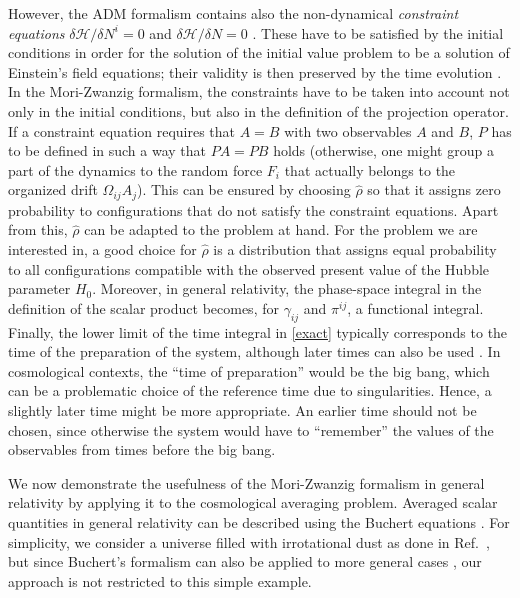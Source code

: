 \documentclass[aps,prl,twocolumn,10pt,superscriptaddress,nofootinbib,balancelastpage]{revtex4-1}
\newcommand{\ZT}[1]{\textquotedblleft#1\textquotedblright}%
\begin{document}
However, the {ADM} formalism contains also the non-dynamical \textit{constraint equations} $\delta \mathcal{H}/\delta N^i=0$ and $\delta \mathcal{H}/\delta N = 0$ \cite{Gourgoulhon2007}. These have to be satisfied by the initial conditions in order for the solution of the initial value problem to be a solution of Einstein's field equations; their validity is then preserved by the time evolution \cite{Gourgoulhon2007,Lehner2001}. In the Mori-Zwanzig formalism, the constraints have to be taken into account not only in the initial conditions, but also in the definition of the projection operator. If a constraint equation requires that $A=B$ with two observables $A$ and $B$, $P$ has to be defined in such a way that $PA=PB$ holds (otherwise, one might group a part of the dynamics to the random force $F_i$ that actually belongs to the organized drift $\Omega_{ij}A_j$). This can be ensured by choosing $\hat{\rho}$ so that it assigns zero probability to configurations that do not satisfy the constraint equations. Apart from this, $\hat{\rho}$ can be adapted to the problem at hand. For the problem we are interested in, a good choice for $\hat{\rho}$ is a distribution that assigns equal probability to all configurations compatible with the observed present value of the Hubble parameter $H_0$. Moreover, in general relativity, the phase-space integral in the definition of the  scalar  product becomes, for $\gamma_{ij}$ and $\pi^{ij}$, a functional integral. Finally, the lower limit of the time integral in \cref{exact} typically corresponds to the time of the preparation of the system, although later times can also be used \cite{Grabert1978}. In cosmological contexts, the \ZT{time of preparation} would be the big bang, which can be a problematic choice of the reference time due to singularities. Hence, a slightly later time might be more appropriate. An earlier time should not be chosen, since otherwise the system would have to \ZT{remember} the values of the observables from times before the big bang. 

We now demonstrate the usefulness of the Mori-Zwanzig formalism in general relativity by applying it to the cosmological averaging problem. Averaged scalar quantities in general relativity can be described using the Buchert equations \cite{Buchert2000,Buchert2001,BuchertMR2020}. For simplicity, we consider a universe filled with irrotational dust as done in Ref.\ \cite{Buchert2000}, but since Buchert's formalism can also be applied to more general cases \cite{BuchertMR2020}, our approach is not restricted to this simple example.
\end{document}
